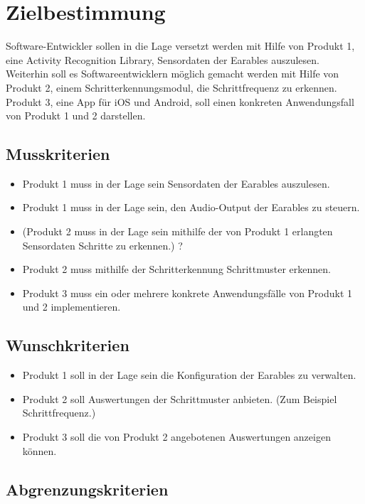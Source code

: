 
	\chapter{Zielbestimmung}
		Software-Entwickler sollen in die Lage versetzt werden mit Hilfe von Produkt 1, eine Activity Recognition Library, Sensordaten der Earables auszulesen. 
		Weiterhin soll es Softwareentwicklern möglich gemacht werden mit Hilfe von Produkt 2, einem Schritterkennungsmodul, die Schrittfrequenz zu erkennen.
		Produkt 3, eine App für iOS und Android, soll einen konkreten Anwendungsfall von Produkt 1 und 2 darstellen.
		\section{Musskriterien}
		\begin{itemize}
			\item Produkt 1 muss in der Lage sein Sensordaten der Earables auszulesen.
			\item Produkt 1 muss in der Lage sein, den Audio-Output der Earables zu steuern.
			\item (Produkt 2 muss in der Lage sein mithilfe der von Produkt 1 erlangten Sensordaten Schritte zu erkennen.) ?
			\item Produkt 2 muss mithilfe der Schritterkennung Schrittmuster erkennen.
			\item Produkt 3 muss ein oder mehrere konkrete Anwendungsfälle von Produkt 1 und 2 implementieren.
		\end{itemize}
		\section{Wunschkriterien}
		\begin{itemize}
			\item Produkt 1 soll in der Lage sein die Konfiguration der Earables zu verwalten.
			\item Produkt 2 soll Auswertungen der Schrittmuster anbieten. (Zum Beispiel Schrittfrequenz.)
			\item Produkt 3 soll die von Produkt 2 angebotenen Auswertungen anzeigen können.
		\end{itemize}
		\section{Abgrenzungskriterien}